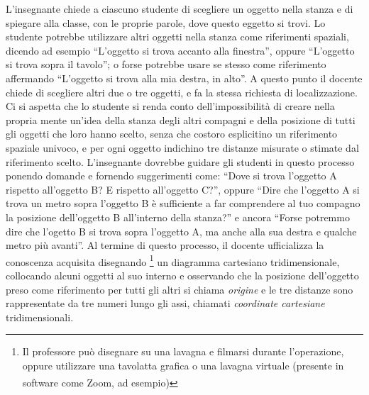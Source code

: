 \documentclass{report} \usepackage[T1]{fontenc} \usepackage[italian]{babel}
\begin{document}
L'insegnante chiede a ciascuno studente di scegliere un oggetto nella stanza e di
spiegare alla classe, con le proprie parole, dove questo eggetto si trovi.
Lo studente potrebbe utilizzare altri oggetti nella stanza come riferimenti spaziali,
dicendo ad esempio ``L'oggetto si trova accanto alla finestra'', oppure
``L'oggetto si trova sopra il tavolo''; o forse potrebbe usare se stesso come
riferimento affermando ``L'oggetto si trova alla mia destra, in alto''.
A questo punto il docente chiede di scegliere altri due o tre oggetti,
e fa la stessa richiesta di localizzazione. Ci si aspetta che lo studente
si renda conto dell'impossibilità di creare nella propria mente un'idea della stanza
degli altri compagni e della posizione di tutti gli oggetti che loro hanno scelto, senza che
costoro esplicitino un riferimento spaziale univoco, e per ogni oggetto indichino tre distanze
misurate o stimate dal riferimento scelto.
L'insegnante dovrebbe guidare gli studenti in questo processo ponendo domande e fornendo suggerimenti
come: ``Dove si trova l'oggetto A rispetto all'oggetto B? E rispetto all'oggetto C?'',
oppure ``Dire che l'oggetto A si trova un metro sopra l'oggetto B è sufficiente
a far comprendere al tuo compagno la posizione dell'oggetto B all'interno della stanza?''
e ancora ``Forse potremmo dire che l'ogetto B si trova sopra l'oggetto A, ma anche alla sua destra
e qualche metro più avanti''.
Al termine di questo processo, il docente ufficializza la conoscenza acquisita disegnando
\footnote{
Il professore può disegnare su una lavagna e filmarsi durante l'operazione, oppure
utilizzare una tavolatta grafica o una lavagna virtuale (presente in software
come Zoom\textsuperscript{\textregistered}, ad esempio)
}          
un diagramma cartesiano tridimensionale, collocando alcuni oggetti al suo interno
e osservando che la posizione dell'oggetto preso come riferimento per tutti gli altri
si chiama \emph{origine} e le tre distanze sono rappresentate da tre numeri lungo
gli assi, chiamati \emph{coordinate cartesiane} tridimensionali.

{}

\end{document}
